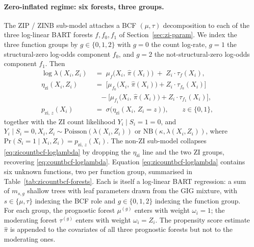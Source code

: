 \documentclass[11pt]{article}
\theoremstyle{plain}
\theoremstyle{definition}
\theoremstyle{remark}
\newcommand{\Poi}{\mathrm{Poisson}}
\newcommand{\NB}{\mathrm{NB}}
\renewcommand{\Pr}{\mathrm{Pr}}
\newcommand{\muF}{\mu_f}
\newcommand{\tauF}{\tau_f}
\newcommand{\pihat}{\widehat{\pi}}
\newcommand{\Si}{S_{i}}
\newcommand{\pzi}[1][z]{p_{\mathrm{zi},\,#1}}
\newcommand{\etazi}{\eta_{\mathrm{zi}}}
\newcommand{\fzeroSym}{f_{0}}
\newcommand{\foneSym}{f_{1}}
\newcommand{\muFzero}{\mu_{f_{0}}}
\newcommand{\muFone}{\mu_{f_{1}}}
\newcommand{\tauFzero}{\tau_{f_{0}}}
\newcommand{\tauFone}{\tau_{f_{1}}}
\newcommand{\omegai}{\omega_{i}}
\begin{document}
\paragraph{Zero-inflated regime: six forests, three groups.}
The ZIP / ZINB sub-model attaches a BCF $(\mu, \tau)$ decomposition
to each of the three log-linear BART forests $f, \fzeroSym, \foneSym$
of Section~\ref{sec:zi-param}. We index the three function groups by
$g \in \{0, 1, 2\}$ with $g = 0$ the count log-rate, $g = 1$ the
structural-zero log-odds component $\fzeroSym$, and $g = 2$ the
not-structural-zero log-odds component $\foneSym$. Then
\begin{equation}
  \boxed{\;
    \begin{aligned}
      \log \lambda(X_i, Z_i)
        &\;=\; \muF\!\bigl(X_i,\, \pihat(X_i)\bigr)
               \;+\; Z_i \cdot \tauF(X_i), \\[2pt]
      \etazi(X_i, Z_i)
        &\;=\; \bigl[\muFzero\!\bigl(X_i,\, \pihat(X_i)\bigr)
                     + Z_i \cdot \tauFzero(X_i)\bigr] \\
        &\quad - \bigl[\muFone\!\bigl(X_i,\, \pihat(X_i)\bigr)
                       + Z_i \cdot \tauFone(X_i)\bigr], \\[2pt]
      \pzi(X_i)
        &\;=\; \sigma\!\bigl(\etazi(X_i,\, Z_i = z)\bigr), \qquad z \in \{0, 1\},
    \end{aligned}
  \;}
  \label{eq:zicountbcf-loglambda}
\end{equation}
together with the ZI count likelihood
$Y_i \mid \Si = 1 = 0$, and
$Y_i \mid \Si = 0, X_i, Z_i \sim \Poi(\lambda(X_i, Z_i))$ or
$\NB(\kappa, \lambda(X_i, Z_i))$, where
$\Pr(\Si = 1 \mid X_i, Z_i) = \pzi(X_i)$. The non-ZI sub-model
collapses \eqref{eq:zicountbcf-loglambda} by dropping the $\etazi$
line and the two ZI groups, recovering \eqref{eq:countbcf-loglambda}.
Equation \eqref{eq:zicountbcf-loglambda} contains six unknown
functions, two per function group, summarised in
Table~\ref{tab:zicountbcf-forests}. Each is itself a log-linear BART
regression: a sum of $m_{s, g}$ shallow trees with leaf parameters
drawn from the GIG mixture, with $s \in \{\mu, \tau\}$ indexing the
BCF role and $g \in \{0, 1, 2\}$ indexing the function group. For
each group, the prognostic forest $\mu^{(g)}$ enters with weight
$\omegai = 1$; the moderating forest $\tau^{(g)}$ enters with weight
$\omegai = Z_i$. The propensity score estimate $\pihat$ is appended
to the covariates of all three prognostic forests but not to the
moderating ones.
\end{document}
